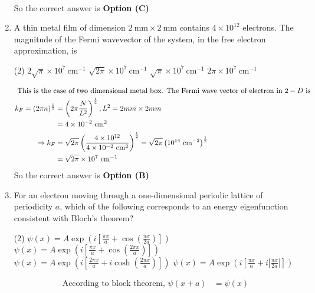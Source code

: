 \begin{enumerate}
\begin{answer}
\begin{align*}
\end{align*}
So the correct answer is \textbf{Option (C)}
\end{answer}
	\item A thin metal film of dimension $2 \mathrm{~mm} \times 2 \mathrm{~mm}$ contains $4 \times 10^{12}$ electrons. The magnitude of the Fermi wavevector of the system, in the free electron approximation, is 
	{}
\begin{tasks}(2)
\task[\textbf{A.}] $2 \sqrt{\pi} \times 10^{7} \mathrm{~cm}^{-1}$
\task[\textbf{B.}] $\sqrt{2 \pi} \times 10^{7} \mathrm{~cm}^{-1}$
\task[\textbf{C.}] $\sqrt{\pi} \times 10^{7} \mathrm{~cm}^{-1}$
\task[\textbf{D.}] $2 \pi \times 10^{7} \mathrm{~cm}^{-1}$
\end{tasks}
\begin{answer}
\begin{align*}
\intertext{ This is the case of two dimensional metal box. The Fermi wave vector of electron in $2-D$ is}
k_{F}=(2 \pi n)^{\frac{1}{2}}&=\left(2 \pi \frac{N}{L^{2}}\right)^{\frac{1}{2}} ; L^{2}=2 m m \times 2 m m\\&=4 \times 10^{-2} \mathrm{~cm}^{2}\\
\Rightarrow k_{F}&=\sqrt{2 \pi}\left(\frac{4 \times 10^{12}}{4 \times 10^{-2} \mathrm{~cm}^{2}}\right)^{\frac{1}{2}}=\sqrt{2 \pi}\left(10^{14} \mathrm{~cm}^{-2}\right)^{\frac{1}{2}}\\&=\sqrt{2 \pi} \times 10^{7} \mathrm{~cm}^{-1}
\end{align*}
So the correct answer is \textbf{Option (B)}
\end{answer}
	\item For an electron moving through a one-dimensional periodic lattice of periodicity $a$, which of the following corresponds to an energy eigenfunction consistent with Bloch's theorem?
	{}
\begin{tasks}(2)
\task[\textbf{A.}] $\psi(x)=A \exp \left(i\left[\frac{\pi x}{a}+\cos \left(\frac{\pi x}{2 a}\right)\right]\right)$
\task[\textbf{B.}] $\psi(x)=A \exp \left(i\left[\frac{\pi x}{a}+\cos \left(\frac{2 \pi x}{a}\right)\right]\right)$
\task[\textbf{C.}] $\psi(x)=A \exp \left(i\left[\frac{2 \pi x}{a}+i \cosh \left(\frac{2 \pi x}{a}\right)\right]\right)$
\task[\textbf{D.}] $\psi(x)=A \exp \left(i\left[\frac{\pi x}{a}+i\left|\frac{\pi x}{2 a}\right|\right]\right)$
\end{tasks}
\begin{answer}
\begin{align*}
\text{According to block theorem, }\psi(x+a)&=\psi(x)\\

\end{align*}
\end{answer}
\end{enumerate}
